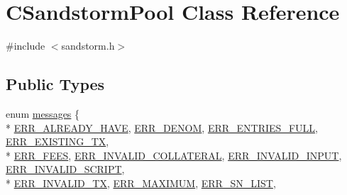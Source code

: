 \hypertarget{class_c_sandstorm_pool}{}\section{C\+Sandstorm\+Pool Class Reference}
\label{class_c_sandstorm_pool}


{\ttfamily \#include $<$sandstorm.\+h$>$}

\subsection*{Public Types}
\begin{DoxyCompactItemize}
\item 
enum \hyperlink{class_c_sandstorm_pool_a539548228c53649bed42e158a86eded2}{messages} \{ \\*
\hyperlink{class_c_sandstorm_pool_a539548228c53649bed42e158a86eded2a2cb39f1970ed231a8168e1a8fefd042d}{E\+R\+R\+\_\+\+A\+L\+R\+E\+A\+D\+Y\+\_\+\+H\+A\+V\+E}, 
\hyperlink{class_c_sandstorm_pool_a539548228c53649bed42e158a86eded2a2727d0dcde9ffc488149dcc5f59dac58}{E\+R\+R\+\_\+\+D\+E\+N\+O\+M}, 
\hyperlink{class_c_sandstorm_pool_a539548228c53649bed42e158a86eded2a55776fc0a12adc3b13f3aa6e9e1f81f2}{E\+R\+R\+\_\+\+E\+N\+T\+R\+I\+E\+S\+\_\+\+F\+U\+L\+L}, 
\hyperlink{class_c_sandstorm_pool_a539548228c53649bed42e158a86eded2ab65911a0da944db7532e36fca3ecbe82}{E\+R\+R\+\_\+\+E\+X\+I\+S\+T\+I\+N\+G\+\_\+\+T\+X}, 
\\*
\hyperlink{class_c_sandstorm_pool_a539548228c53649bed42e158a86eded2ab4316c0b0f3099c03356e0f46628a508}{E\+R\+R\+\_\+\+F\+E\+E\+S}, 
\hyperlink{class_c_sandstorm_pool_a539548228c53649bed42e158a86eded2aee7148a9f7f9cf79846a310a9c61a3e5}{E\+R\+R\+\_\+\+I\+N\+V\+A\+L\+I\+D\+\_\+\+C\+O\+L\+L\+A\+T\+E\+R\+A\+L}, 
\hyperlink{class_c_sandstorm_pool_a539548228c53649bed42e158a86eded2a8fd4c302d1eab85bf72d5941f3d84625}{E\+R\+R\+\_\+\+I\+N\+V\+A\+L\+I\+D\+\_\+\+I\+N\+P\+U\+T}, 
\hyperlink{class_c_sandstorm_pool_a539548228c53649bed42e158a86eded2adb56e517793e4e747c9020e20fa52cc3}{E\+R\+R\+\_\+\+I\+N\+V\+A\+L\+I\+D\+\_\+\+S\+C\+R\+I\+P\+T}, 
\\*
\hyperlink{class_c_sandstorm_pool_a539548228c53649bed42e158a86eded2a84514dca9d5612b95e77dd13a8ab261d}{E\+R\+R\+\_\+\+I\+N\+V\+A\+L\+I\+D\+\_\+\+T\+X}, 
\hyperlink{class_c_sandstorm_pool_a539548228c53649bed42e158a86eded2ab52414cda269cecb60b8675531672e0a}{E\+R\+R\+\_\+\+M\+A\+X\+I\+M\+U\+M}, 
\hyperlink{class_c_sandstorm_pool_a539548228c53649bed42e158a86eded2a9636ac06a1f35cd7dc3a72419ccb3148}{E\+R\+R\+\_\+\+S\+N\+\_\+\+L\+I\+S\+T}, 

\end{DoxyCompactItemize}
